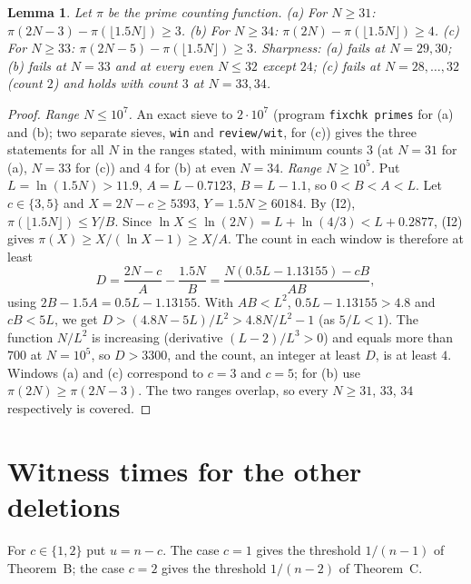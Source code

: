 \documentclass[11pt]{article}
\newtheorem{lemma}{Lemma}
\theoremstyle{remark}
\begin{document}
\begin{lemma}\label{lem:windows}
Let $\pi$ be the prime counting function. (a) For $N\ge31$: $\pi(2N-3)-\pi(\lfloor1.5N\rfloor)\ge3$. (b) For $N\ge34$: $\pi(2N)-\pi(\lfloor1.5N\rfloor)\ge4$. (c) For $N\ge33$: $\pi(2N-5)-\pi(\lfloor1.5N\rfloor)\ge3$. Sharpness: (a) fails at $N=29,30$; (b) fails at $N=33$ and at every even $N\le32$ except $24$; (c) fails at $N=28,\dots,32$ (count $2$) and holds with count $3$ at $N=33,34$.
\end{lemma}
\begin{proof}
\emph{Range $N\le10^7$.} An exact sieve to $2\cdot10^7$ (program \texttt{fixchk primes} for (a) and (b); two separate sieves, \texttt{win} and \texttt{review/wit}, for (c)) gives the three statements for all $N$ in the ranges stated, with minimum counts $3$ (at $N=31$ for (a), $N=33$ for (c)) and $4$ for (b) at even $N=34$.
\emph{Range $N\ge10^5$.} Put $L=\ln(1.5N)>11.9$, $A=L-0.7123$, $B=L-1.1$, so $0<B<A<L$. Let $c\in\{3,5\}$ and $X=2N-c\ge5393$, $Y=1.5N\ge60184$. By (I2), $\pi(\lfloor1.5N\rfloor)\le Y/B$. Since $\ln X\le\ln(2N)=L+\ln(4/3)<L+0.2877$, (I2) gives $\pi(X)\ge X/(\ln X-1)\ge X/A$. The count in each window is therefore at least
\[
D=\frac{2N-c}{A}-\frac{1.5N}{B}=\frac{N(0.5L-1.13155)-cB}{AB},
\]
using $2B-1.5A=0.5L-1.13155$. With $AB<L^2$, $0.5L-1.13155>4.8$ and $cB<5L$, we get $D>(4.8N-5L)/L^2>4.8N/L^2-1$ (as $5/L<1$). The function $N/L^2$ is increasing (derivative $(L-2)/L^3>0$) and equals more than $700$ at $N=10^5$, so $D>3300$, and the count, an integer at least $D$, is at least $4$. Windows (a) and (c) correspond to $c=3$ and $c=5$; for (b) use $\pi(2N)\ge\pi(2N-3)$.
The two ranges overlap, so every $N\ge31$, $33$, $34$ respectively is covered.
\end{proof}

\section{Witness times for the other deletions}\label{sec:witness}

For $c\in\{1,2\}$ put $u=n-c$. The case $c=1$ gives the threshold $1/(n-1)$ of Theorem~B; the case $c=2$ gives the threshold $1/(n-2)$ of Theorem~C.
\end{document}
